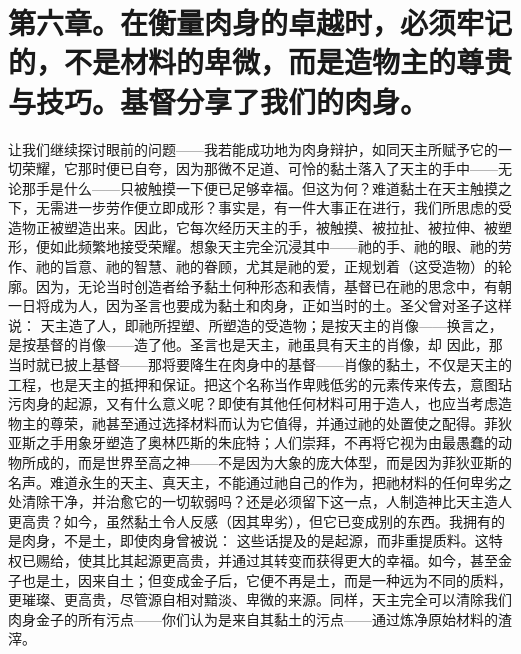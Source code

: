 
\section{第六章。在衡量肉身的卓越时，必须牢记的，不是材料的卑微，而是造物主的尊贵与技巧。基督分享了我们的肉身。}

让我们继续探讨眼前的问题——我若能成功地为肉身辩护，如同天主所赋予它的一切荣耀，它那时便已自夸，因为那微不足道、可怜的黏土落入了天主的手中——无论那手是什么——只被触摸一下便已足够幸福。但这为何？难道黏土在天主触摸之下，无需进一步劳作便立即成形？事实是，有一件大事正在进行，我们所思虑的受造物正被塑造出来。因此，它每次经历天主的手，被触摸、被拉扯、被拉伸、被塑形，便如此频繁地接受荣耀。想象天主完全沉浸其中——祂的手、祂的眼、祂的劳作、祂的旨意、祂的智慧、祂的眷顾，尤其是祂的爱，正规划着（这受造物）的轮廓。因为，无论当时创造者给予黏土何种形态和表情，基督已在祂的思念中，有朝一日将成为人，因为圣言也要成为黏土和肉身，正如当时的土。圣父曾对圣子这样说： 天主造了人，即祂所捏塑、所塑造的受造物；是按天主的肖像——换言之，是按基督的肖像——造了他。圣言也是天主，祂虽具有天主的肖像，却 因此，那当时就已披上基督——那将要降生在肉身中的基督——肖像的黏土，不仅是天主的工程，也是天主的抵押和保证。把这个名称当作卑贱低劣的元素传来传去，意图玷污肉身的起源，又有什么意义呢？即使有其他任何材料可用于造人，也应当考虑造物主的尊荣，祂甚至通过选择材料而认为它值得，并通过祂的处置使之配得。菲狄亚斯之手用象牙塑造了奥林匹斯的朱庇特；人们崇拜，不再将它视为由最愚蠢的动物所成的，而是世界至高之神——不是因为大象的庞大体型，而是因为菲狄亚斯的名声。难道永生的天主、真天主，不能通过祂自己的作为，把祂材料的任何卑劣之处清除干净，并治愈它的一切软弱吗？还是必须留下这一点，人制造神比天主造人更高贵？如今，虽然黏土令人反感（因其卑劣），但它已变成别的东西。我拥有的是肉身，不是土，即使肉身曾被说： 这些话提及的是起源，而非重提质料。这特权已赐给，使其比其起源更高贵，并通过其转变而获得更大的幸福。如今，甚至金子也是土，因来自土；但变成金子后，它便不再是土，而是一种远为不同的质料，更璀璨、更高贵，尽管源自相对黯淡、卑微的来源。同样，天主完全可以清除我们肉身金子的所有污点——你们认为是来自其黏土的污点——通过炼净原始材料的渣滓。\par



